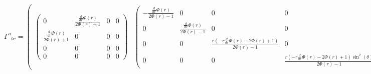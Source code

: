 \documentclass[11pt]{article}
\begin{document}
\begin{landscape}
$${\Gamma^{a}}_{bc}=\begin{pmatrix} \begin{pmatrix} 0 & \frac{\frac{d}{d r} \Phi{\left(r \right)}}{2 \Phi{\left(r \right)} + 1} & 0 & 0\\ \frac{\frac{d}{d r} \Phi{\left(r \right)}}{2 \Phi{\left(r \right)} + 1} & 0 & 0 & 0\\ 0 & 0 & 0 & 0\\ 0 & 0 & 0 & 0 \end{pmatrix} & \begin{pmatrix} - \frac{\frac{d}{d r} \Phi{\left(r \right)}}{2 \Phi{\left(r \right)} - 1} & 0 & 0 & 0\\ 0 & \frac{\frac{d}{d r} \Phi{\left(r \right)}}{2 \Phi{\left(r \right)} - 1} & 0 & 0\\ 0 & 0 & \frac{r \left(- r \frac{d}{d r} \Phi{\left(r \right)} - 2 \Phi{\left(r \right)} + 1\right)}{2 \Phi{\left(r \right)} - 1} & 0\\ 0 & 0 & 0 & \frac{r \left(- r \frac{d}{d r} \Phi{\left(r \right)} - 2 \Phi{\left(r \right)} + 1\right) \sin^{2}{\left(\theta \right)}}{2 \Phi{\left(r \right)} - 1} \end{pmatrix} & \begin{pmatrix} 0 & 0 & 0 & 0\\ 0 & 0 & \frac{r \frac{d}{d r} \Phi{\left(r \right)} + 2 \Phi{\left(r \right)} - 1}{r \left(2 \Phi{\left(r \right)} - 1\right)} & 0\\ 0 & \frac{r \frac{d}{d r} \Phi{\left(r \right)} + 2 \Phi{\left(r \right)} - 1}{r \left(2 \Phi{\left(r \right)} - 1\right)} & 0 & 0\\ 0 & 0 & 0 & - \sin{\left(\theta \right)} \cos{\left(\theta \right)} \end{pmatrix} & \begin{pmatrix} 0 & 0 & 0 & 0\\ 0 & 0 & 0 & \frac{r \frac{d}{d r} \Phi{\left(r \right)} + 2 \Phi{\left(r \right)} - 1}{r \left(2 \Phi{\left(r \right)} - 1\right)}\\ 0 & 0 & 0 & \frac{1}{\tan{\left(\theta \right)}}\\ 0 & \frac{r \frac{d}{d r} \Phi{\left(r \right)} + 2 \Phi{\left(r \right)} - 1}{r \left(2 \Phi{\left(r \right)} - 1\right)} & \frac{1}{\tan{\left(\theta \right)}} & 0 \end{pmatrix} \end{pmatrix},$$

\end{landscape}
\end{document}
